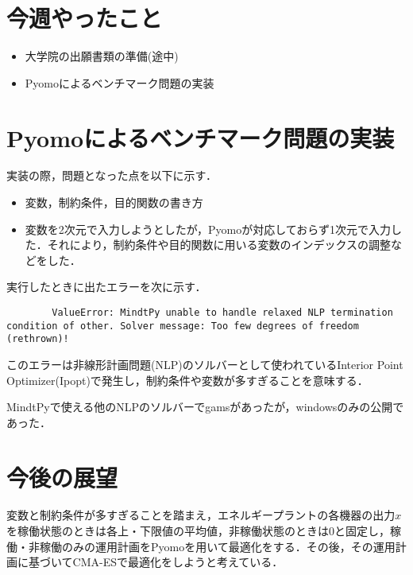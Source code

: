 \documentclass[twocolumn]{jarticle}
\begin{document}


\section{今週やったこと}
	\begin{itemize}
		\item 大学院の出願書類の準備(途中)
        \item Pyomoによるベンチマーク問題の実装
	\end{itemize}
\section{Pyomoによるベンチマーク問題の実装}
    実装の際，問題となった点を以下に示す．
    \begin{itemize}
        \item 変数，制約条件，目的関数の書き方
        \item 変数を2次元で入力しようとしたが，Pyomoが対応しておらず1次元で入力した．それにより，制約条件や目的関数に用いる変数のインデックスの調整などをした．
    \end{itemize}
    実行したときに出たエラーを次に示す．
    \begin{lstlisting}
        ValueError: MindtPy unable to handle relaxed NLP termination condition of other. Solver message: Too few degrees of freedom (rethrown)!
    \end{lstlisting}
    このエラーは非線形計画問題(NLP)のソルバーとして使われているInterior Point Optimizer(Ipopt)\cite{Ipopt}で発生し，制約条件や変数が多すぎることを意味する．
    
    MindtPyで使える他のNLPのソルバーでgamsがあったが，windowsのみの公開であった．
\section{今後の展望}
    変数と制約条件が多すぎることを踏まえ，エネルギープラントの各機器の出力$x$を稼働状態のときは各上・下限値の平均値，非稼働状態のときは0と固定し，稼働・非稼働のみの運用計画をPyomoを用いて最適化をする．その後，その運用計画に基づいてCMA-ESで最適化をしようと考えている．

\end{document}
